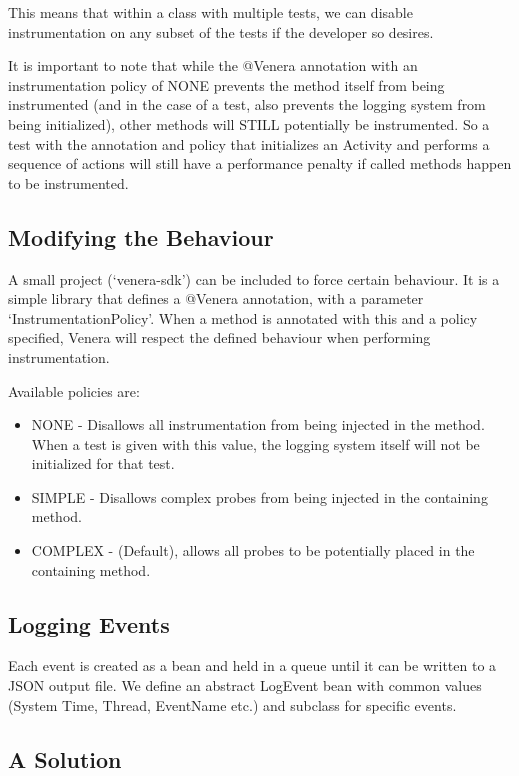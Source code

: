 This means that within a class with multiple tests, we can disable
instrumentation on any subset of the tests if the developer so desires.

It is important to note that while the @Venera annotation with an
instrumentation policy of NONE prevents the method itself from being
instrumented (and in the case of a test, also prevents the logging system from
being initialized), other methods will STILL potentially be instrumented. So a
test with the annotation and policy that initializes an Activity and performs a
sequence of actions will still have a performance penalty if called methods
happen to be instrumented.


\subsection{Modifying the Behaviour}

A small project ({\lq}venera-sdk{\rq}) can be included to force certain
behaviour. It is a simple library that defines a @Venera annotation, with a
parameter {\lq}InstrumentationPolicy{\rq}. When a method is annotated with this
and a policy specified, Venera will respect the defined behaviour when
performing instrumentation.

Available policies are:

\begin{itemize}
  \item NONE - Disallows all instrumentation from being injected in the method.
  When a test is given with this value, the logging system itself will not be
  initialized for that test.
  \item SIMPLE - Disallows complex probes from being injected in the containing
  method.
  \item COMPLEX - (Default), allows all probes to be potentially placed in the
  containing method.
\end{itemize}


\subsection{Logging Events}

Each event is created as a bean and held in a queue until it can be written to a
JSON output file. We define an abstract LogEvent bean with common values (System
Time, Thread, EventName etc.) and subclass for specific events.

\subsection{A Solution}

